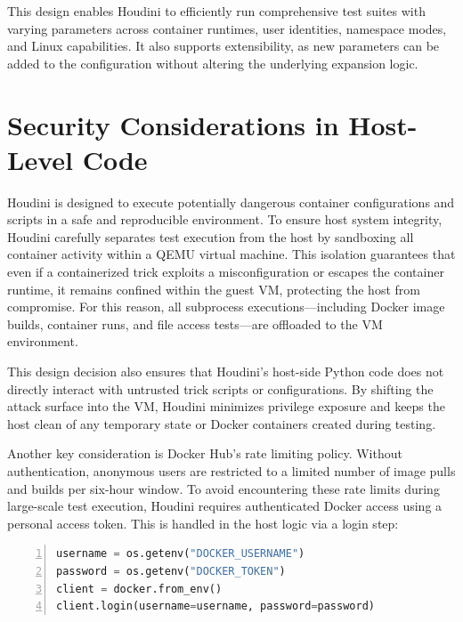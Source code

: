 \documentclass[12pt]{report}
\begin{document}
\begin{doublespace}
This design enables Houdini to efficiently run comprehensive test suites with varying parameters across container runtimes, user identities, namespace modes, and Linux capabilities. It also supports extensibility, as new parameters can be added to the configuration without altering the underlying expansion logic.


\section{Security Considerations in Host-Level Code}

Houdini is designed to execute potentially dangerous container configurations and scripts in a safe and reproducible environment. To ensure host system integrity, Houdini carefully separates test execution from the host by sandboxing all container activity within a QEMU virtual machine. This isolation guarantees that even if a containerized trick exploits a misconfiguration or escapes the container runtime, it remains confined within the guest VM, protecting the host from compromise. For this reason, all subprocess executions—including Docker image builds, container runs, and file access tests—are offloaded to the VM environment.

This design decision also ensures that Houdini's host-side Python code does not directly interact with untrusted trick scripts or configurations. By shifting the attack surface into the VM, Houdini minimizes privilege exposure and keeps the host clean of any temporary state or Docker containers created during testing.

Another key consideration is Docker Hub's rate limiting policy. Without authentication, anonymous users are restricted to a limited number of image pulls and builds per six-hour window. To avoid encountering these rate limits during large-scale test execution, Houdini requires authenticated Docker access using a personal access token. This is handled in the host logic via a login step:

\begin{lstlisting}[language=python, caption={Logging into Docker Hub to bypass image build limits}, label={lst:docker-login}, numbers=left, numberstyle=\tiny, stepnumber=1, breaklines=true, frame=single, backgroundcolor=\color{gray!10}, basicstyle=\ttfamily\footnotesize, showspaces=false, showstringspaces=false]
username = os.getenv("DOCKER_USERNAME")
password = os.getenv("DOCKER_TOKEN")
client = docker.from_env()
client.login(username=username, password=password)
\end{lstlisting}


\end{doublespace}
\end{document}
